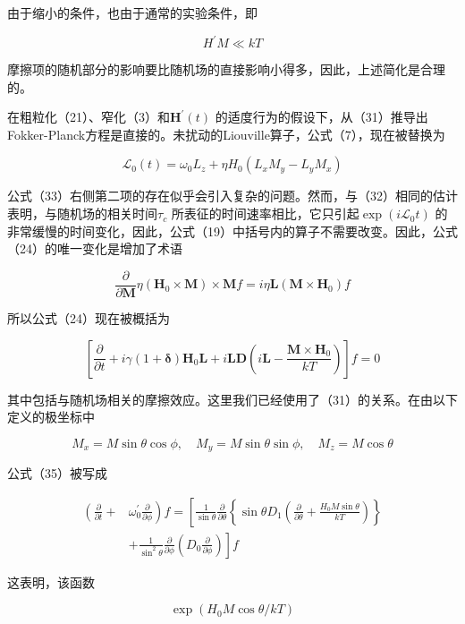 \documentclass[10pt]{article}
\begin{document}
由于缩小的条件，也由于通常的实验条件，即

\[
H^{\prime} M \ll k T
\] 

摩擦项的随机部分的影响要比随机场的直接影响小得多，因此，上述简化是合理的。

在粗粒化（21）、窄化（3）和\(\boldsymbol{H}^{\prime}(t)\) 的适度行为的假设下，从（31）推导出Fokker-Planck方程是直接的。未扰动的Liouville算子，公式（7），现在被替换为

\[
\mathcal{L}_{0}(t)=\omega_{0} L_{z}+\eta H_{0}\left(L_{x} M_{y}-L_{y} M_{x}\right)
\] 

公式（33）右侧第二项的存在似乎会引入复杂的问题。然而，与（32）相同的估计表明，与随机场的相关时间\(\tau_{c}\) 所表征的时间速率相比，它只引起\(\exp \left(i \mathcal{L}_{0} t\right)\) 的非常缓慢的时间变化，因此，公式（19）中括号内的算子不需要改变。因此，公式（24）的唯一变化是增加了术语

\[
\frac{\partial}{\partial \boldsymbol{M}} \eta\left(\boldsymbol{H}_{0} \times \boldsymbol{M}\right) \times \boldsymbol{M} f=i \eta \boldsymbol{L}\left(\boldsymbol{M} \times \boldsymbol{H}_{0}\right) f
\] 

所以公式（24）现在被概括为

\[
\left[\frac{\partial}{\partial t}+i \gamma(1+\boldsymbol{\delta}) \boldsymbol{H}_{0} \boldsymbol{L}+i \boldsymbol{L} \boldsymbol{D}\left(i \boldsymbol{L}-\frac{\boldsymbol{M} \times \boldsymbol{H}_{0}}{k T}\right)\right] f=0
\] 

其中包括与随机场相关的摩擦效应。这里我们已经使用了（31）的关系。在由以下定义的极坐标中

\[
M_{x}=M \sin \theta \cos \phi, \quad M_{y}=M \sin \theta \sin \phi, \quad M_{z}=M \cos \theta
\] 

公式（35）被写成

\[
\begin{aligned}
\left(\frac{\partial}{\partial t}+\right. & \left.\omega_{0}^{\prime} \frac{\partial}{\partial \phi}\right) f=\left[\frac{1}{\sin \theta} \frac{\partial}{\partial \theta}\left\{\sin \theta D_{1}\left(\frac{\partial}{\partial \theta}+\frac{H_{0} M \sin \theta}{k T}\right)\right\}\right. \\
& \left.+\frac{1}{\sin ^{2} \theta} \frac{\partial}{\partial \phi}\left(D_{0} \frac{\partial}{\partial \phi}\right)\right] f
\end{aligned}
\] 

这表明，该函数

\[
\exp \left(H_{0} M \cos \theta / k T\right)
\] 
\end{document}
